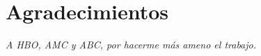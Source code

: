 \chapter*{Agradecimientos}
\begin{flushright}
  \vspace{10mm}
  \emph{A HBO, AMC y ABC, por hacerme más ameno el trabajo.}\hspace{1cm}\\
\end{flushright}